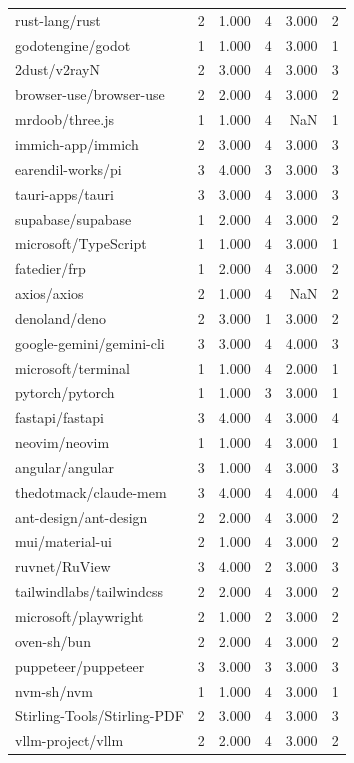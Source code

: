 \begin{tabular}{lrrrrr}
rust-lang/rust & 2 & 1.000 & 4 & 3.000 & 2 \\
godotengine/godot & 1 & 1.000 & 4 & 3.000 & 1 \\
2dust/v2rayN & 2 & 3.000 & 4 & 3.000 & 3 \\
browser-use/browser-use & 2 & 2.000 & 4 & 3.000 & 2 \\
mrdoob/three.js & 1 & 1.000 & 4 & NaN & 1 \\
immich-app/immich & 2 & 3.000 & 4 & 3.000 & 3 \\
earendil-works/pi & 3 & 4.000 & 3 & 3.000 & 3 \\
tauri-apps/tauri & 3 & 3.000 & 4 & 3.000 & 3 \\
supabase/supabase & 1 & 2.000 & 4 & 3.000 & 2 \\
microsoft/TypeScript & 1 & 1.000 & 4 & 3.000 & 1 \\
fatedier/frp & 1 & 2.000 & 4 & 3.000 & 2 \\
axios/axios & 2 & 1.000 & 4 & NaN & 2 \\
denoland/deno & 2 & 3.000 & 1 & 3.000 & 2 \\
google-gemini/gemini-cli & 3 & 3.000 & 4 & 4.000 & 3 \\
microsoft/terminal & 1 & 1.000 & 4 & 2.000 & 1 \\
pytorch/pytorch & 1 & 1.000 & 3 & 3.000 & 1 \\
fastapi/fastapi & 3 & 4.000 & 4 & 3.000 & 4 \\
neovim/neovim & 1 & 1.000 & 4 & 3.000 & 1 \\
angular/angular & 3 & 1.000 & 4 & 3.000 & 3 \\
thedotmack/claude-mem & 3 & 4.000 & 4 & 4.000 & 4 \\
ant-design/ant-design & 2 & 2.000 & 4 & 3.000 & 2 \\
mui/material-ui & 2 & 1.000 & 4 & 3.000 & 2 \\
ruvnet/RuView & 3 & 4.000 & 2 & 3.000 & 3 \\
tailwindlabs/tailwindcss & 2 & 2.000 & 4 & 3.000 & 2 \\
microsoft/playwright & 2 & 1.000 & 2 & 3.000 & 2 \\
oven-sh/bun & 2 & 2.000 & 4 & 3.000 & 2 \\
puppeteer/puppeteer & 3 & 3.000 & 3 & 3.000 & 3 \\
nvm-sh/nvm & 1 & 1.000 & 4 & 3.000 & 1 \\
Stirling-Tools/Stirling-PDF & 2 & 3.000 & 4 & 3.000 & 3 \\
vllm-project/vllm & 2 & 2.000 & 4 & 3.000 & 2 \\

\end{tabular}
